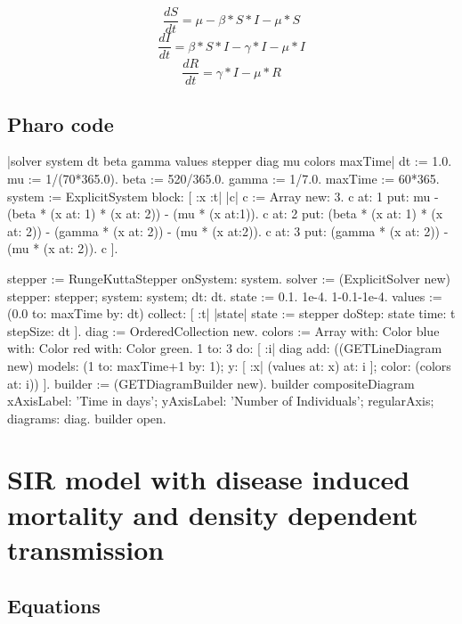\documentclass[a4paper,10pt,twoside]{book}
\begin{document}
\begin{equation}
\frac{dS}{dt} = \mu-\beta*S*I-\mu*S
\end{equation}
\begin{equation}
\frac{dI}{dt} = \beta*S*I-\gamma*I-\mu*I
\end{equation}
\begin{equation}
\frac{dR}{dt} = \gamma*I-\mu*R
\end{equation}
\subsection{ Pharo code}\label{ Pharo code}

\begin{code}{}
|solver system dt beta gamma values stepper diag mu colors maxTime|
dt := 1.0.
mu := 1/(70*365.0).
beta := 520/365.0.
gamma := 1/7.0.
maxTime := 60*365.
system := ExplicitSystem block: [ :x :t| |c|
     c := Array new: 3.
     c at: 1 put: mu - (beta  * (x at: 1) * (x at: 2)) - (mu * (x at:1)).
     c at: 2 put: (beta * (x at: 1) * (x at: 2)) - (gamma * (x at: 2)) - (mu * (x at:2)).
     c at: 3 put: (gamma * (x at: 2)) - (mu * (x at: 2)).
     c
     ].

stepper := RungeKuttaStepper onSystem: system.
solver := (ExplicitSolver new) stepper: stepper; system: system; dt: dt.
state := { 0.1. 1e-4. 1-0.1-1e-4}.
values := (0.0 to: maxTime by: dt) collect: [ :t| |state| state := stepper doStep: state
                                                          time: t stepSize: dt ].
diag := OrderedCollection new.
colors := Array with: Color blue with: Color red with: Color green.
1 to: 3 do: [ :i|
    diag add:
        ((GETLineDiagram new)
            models: (1 to: maxTime+1 by: 1);
            y: [ :x| (values at: x) at: i ];
            color: (colors at: i))
     ].
builder := (GETDiagramBuilder new).
builder compositeDiagram
    xAxisLabel: 'Time in days';
    yAxisLabel: 'Number of Individuals';
    regularAxis;
    diagrams: diag.
builder open.
\end{code}

\section{ SIR model with disease induced mortality and density dependent transmission}\label{ SIR model with disease induced mortality and density dependent transmission}\subsection{ Equations}\label{ Equations}
\end{document}
